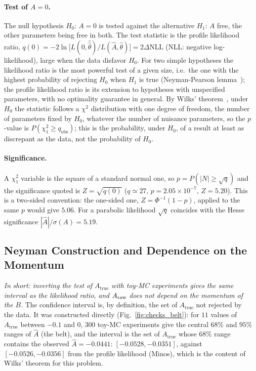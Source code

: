 \paragraph{Test of $A=0$.}
The null hypothesis $H_0$: $A=0$ is tested against the alternative $H_1$: $A$ free, the other parameters being free in both. The test statistic is the profile likelihood ratio,
$q(0)=-2\ln\big[L(0,\hat{\hat\theta})/L(\hat A,\hat\theta)\big]=2\Delta\mathrm{NLL}$ (NLL: negative log-likelihood), large when the data disfavor $H_0$. For two simple hypotheses the likelihood ratio is the most powerful test of a given size, i.e.\ the one with the highest probability of rejecting $H_0$ when $H_1$ is true (Neyman-Pearson lemma~\cite{neyman_pearson}); the profile likelihood ratio is its extension to hypotheses with unspecified parameters, with no optimality guarantee in general. By Wilks' theorem~\cite{wilks}, under $H_0$ the statistic follows a $\chi^2$ distribution with one degree of freedom, the number of parameters fixed by $H_0$, whatever the number of nuisance parameters, so the $p$-value is $P(\chi^2_1\geq q_{\mathrm{obs}})$; this is the probability, under $H_0$, of a result at least as discrepant as the data, not the probability of $H_0$.

\paragraph{Significance.}
A $\chi^2_1$ variable is the square of a standard normal one, so $p=P(|N|\geq\sqrt{q})$ and the significance quoted is $Z=\sqrt{q(0)}$ ($q\simeq27$, $p=2.05\times10^{-7}$, $Z=5.20$). This is a two-sided convention: the one-sided one, $Z=\Phi^{-1}(1-p)$, applied to the same $p$ would give $5.06$. For a parabolic likelihood $\sqrt{q}$ coincides with the Hesse significance $|\hat A|/\sigma(A)=5.19$.

\subsection{Neyman Construction and Dependence on the Momentum}
\label{sec:checks_belt}
\emph{In short: inverting the test of $A_{\mathrm{true}}$ with toy-MC experiments gives the same interval as the likelihood ratio, and $A_{\mathrm{raw}}$ does not depend on the momentum of the $B$.}
The confidence interval is, by definition, the set of $A_{\mathrm{true}}$ not rejected by the data. It was constructed directly (Fig.~\ref{fig:checks_belt}): for $11$ values of $A_{\mathrm{true}}$ between $-0.1$ and $0$, $300$ toy-MC experiments give the central $68\%$ and $95\%$ ranges of $\hat A$ (the belt), and the interval is the set of $A_{\mathrm{true}}$ whose $68\%$ range contains the observed $\hat A=-0.0441$: $[-0.0528,-0.0351]$, against $[-0.0526,-0.0356]$ from the profile likelihood (Minos), which is the content of Wilks' theorem for this problem.

